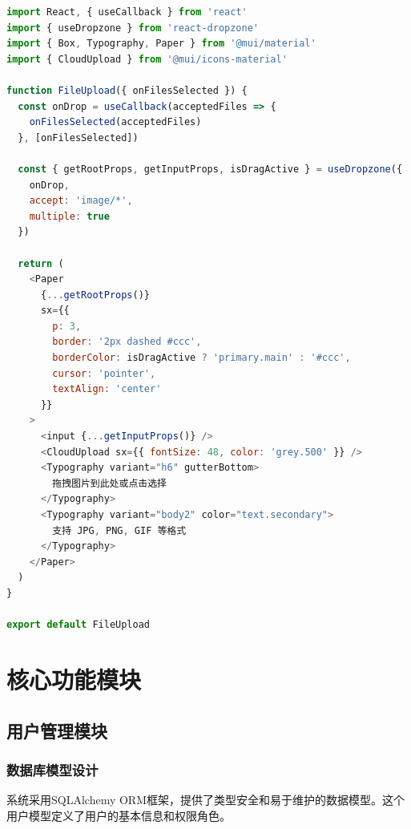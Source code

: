 \documentclass[cs4size,a4paper]{ctexart}
\numberwithin{equation}{section}
\numberwithin{table}{section}
\numberwithin{figure}{section}
\begin{document}
\begin{lstlisting}[language=JavaScript,caption=Material-UI拖拽文件上传组件]
import React, { useCallback } from 'react'
import { useDropzone } from 'react-dropzone'
import { Box, Typography, Paper } from '@mui/material'
import { CloudUpload } from '@mui/icons-material'

function FileUpload({ onFilesSelected }) {
  const onDrop = useCallback(acceptedFiles => {
    onFilesSelected(acceptedFiles)
  }, [onFilesSelected])

  const { getRootProps, getInputProps, isDragActive } = useDropzone({
    onDrop,
    accept: 'image/*',
    multiple: true
  })

  return (
    <Paper
      {...getRootProps()}
      sx={{
        p: 3,
        border: '2px dashed #ccc',
        borderColor: isDragActive ? 'primary.main' : '#ccc',
        cursor: 'pointer',
        textAlign: 'center'
      }}
    >
      <input {...getInputProps()} />
      <CloudUpload sx={{ fontSize: 48, color: 'grey.500' }} />
      <Typography variant="h6" gutterBottom>
        拖拽图片到此处或点击选择
      </Typography>
      <Typography variant="body2" color="text.secondary">
        支持 JPG, PNG, GIF 等格式
      </Typography>
    </Paper>
  )
}

export default FileUpload
\end{lstlisting}

\newpage

\section{核心功能模块}

\subsection{用户管理模块}

\subsubsection{数据库模型设计}

系统采用SQLAlchemy ORM框架，提供了类型安全和易于维护的数据模型。这个用户模型定义了用户的基本信息和权限角色。
\end{document}
